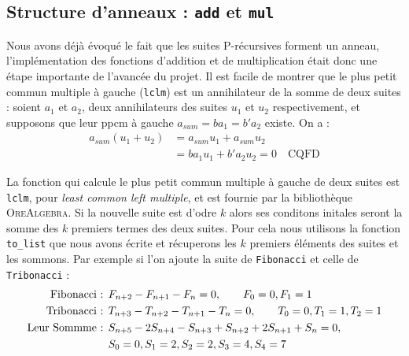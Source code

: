\documentclass[12pt]{article}
\newlength{\charwidth}
\newcommand{\uline}{\underline{\hspace{2\charwidth}}}
\begin{document}
    \subsection{Structure d'anneaux : \texttt{\uline add\uline } et \texttt{\uline mul\uline}}
        \label{sec:ring}
        Nous avons déjà évoqué le fait que les suites P-récursives forment un anneau,
        l'implémentation des fonctions d'addition et de multiplication était donc une étape
        importante de l'avancée du projet.
        Il est facile de montrer que le plus petit commun multiple à gauche (\texttt{lclm})
        est un annihilateur de la somme de deux suites :
        soient $a_1$ et $a_2$, deux annihilateurs des suites $u_1$ et $u_2$ respectivement,
        et supposons que leur ppcm à gauche $a_{sum} = ba_1 = b'a_2$ existe. On a :
        \begin{align*}
            a_{sum}(u_1+u_2) &= a_{sum}u_1 + a_{sum}u_2\\
            &= ba_1u_1 + b'a_2u_2 = 0\quad \text{CQFD}
        \end{align*}

        La fonction qui calcule le plus petit commun multiple à gauche de deux suites
        est \texttt{lclm}, pour \textit{least common left multiple}, et est fournie par la
        bibliothèque \textsc{OreAlgebra}. 
        Si la nouvelle suite est d'odre $k$ alors ses conditons initales seront la somme des 
        $k$ premiers termes des deux suites. Pour cela nous utilisons la fonction
        \texttt{to\_list} que nous avons écrite
        et récuperons les $k$ premiers éléments des suites et les sommons.
        Par exemple si l'on ajoute la suite de \texttt{Fibonacci} et celle de \texttt{Tribonacci} :
        \begin{align*}
            \textnormal{Fibonacci : } &F_{n+2} - F_{n+1} - F_n = 0,\qquad F_0=0, F_1=1\\
            \textnormal{Tribonacci : } &T_{n+3} - T_{n+2} - T_{n+1} - T_n = 0,\qquad T_0 = 0, T_1 = 1, T_2 = 1\\
            \textnormal{Leur Sommme : } &S_{n+5} - 2S_{n+4} - S_{n+3} + S_{n+2} + 2S_{n+1} + S_n = 0,\\
            &S_0 = 0, S_1 = 2, S_2 = 2, S_3 = 4, S_4 = 7
        \end{align*} 
        
\end{document}
